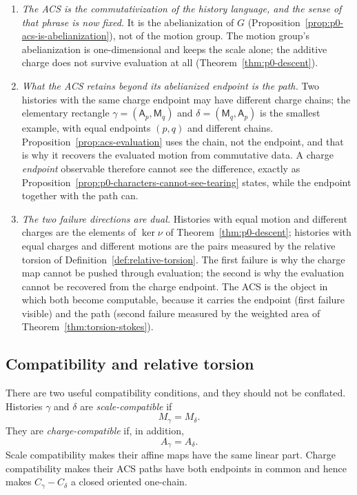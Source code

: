 \begin{enumerate}
  \item \emph{The ACS is the commutativization of the history language, and the
  sense of that phrase is now fixed.}  It is the abelianization of $G$
  (Proposition~\ref{prop:p0-acs-is-abelianization}), not of the motion group.
  The motion group's abelianization is one-dimensional and keeps the scale alone;
  the additive charge does not survive evaluation at all
  (Theorem~\ref{thm:p0-descent}).
  \item \emph{What the ACS retains beyond its abelianized endpoint is the path.}
  Two histories with the same charge endpoint may have different charge chains;
  the elementary rectangle $\gamma=(\mathsf A_p,\mathsf M_q)$ and
  $\delta=(\mathsf M_q,\mathsf A_p)$ is the smallest example, with equal
  endpoints $(p,q)$ and different chains.  Proposition~\ref{prop:acs-evaluation}
  uses the chain, not the endpoint, and that is why it recovers the evaluated
  motion from commutative data.  A charge \emph{endpoint} observable therefore
  cannot see the difference, exactly as
  Proposition~\ref{prop:p0-characters-cannot-see-tearing} states, while the
  endpoint together with the path can.
  \item \emph{The two failure directions are dual.}  Histories with equal motion
  and different charges are the elements of $\ker\nu$ of
  Theorem~\ref{thm:p0-descent}; histories with equal charges and different
  motions are the pairs measured by the relative torsion of
  Definition~\ref{def:relative-torsion}.  The first failure is why the charge map
  cannot be pushed through evaluation; the second is why the evaluation cannot be
  recovered from the charge endpoint.  The ACS is the object in which both become
  computable, because it carries the endpoint (first failure visible) and the
  path (second failure measured by the weighted area of
  Theorem~\ref{thm:torsion-stokes}).
\end{enumerate}

\subsection{Compatibility and relative torsion}

There are two useful compatibility conditions, and they should not be
conflated.  Histories \(\gamma\) and \(\delta\) are \emph{scale-compatible} if
\[
    M_\gamma=M_\delta.
\]
They are \emph{charge-compatible} if, in addition,
\[
    A_\gamma=A_\delta.
\]
Scale compatibility makes their affine maps have the same linear part.  Charge
compatibility makes their ACS paths have both endpoints in common and hence
makes \(C_\gamma-C_\delta\) a closed oriented one-chain.

